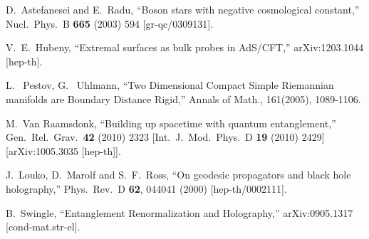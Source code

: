 \documentclass[12pt]{article}
\renewcommand{\(}{\left(}
\renewcommand{\)}{\right)}
\begin{document}
\begin{thebibliography}{999}
  D.~Astefanesei and E.~Radu,
  ``Boson stars with negative cosmological constant,''
  Nucl.\ Phys.\ B {\bf 665} (2003) 594
  [gr-qc/0309131].

  V.~E.~Hubeny,
  ``Extremal surfaces as bulk probes in AdS/CFT,''
  arXiv:1203.1044 [hep-th].

L. ~Pestov, G. ~Uhlmann,
``Two Dimensional Compact Simple Riemannian manifolds are Boundary Distance Rigid,''
Annals of Math., 161(2005), 1089-1106.

  M.~Van Raamsdonk,
  ``Building up spacetime with quantum entanglement,''
  Gen.\ Rel.\ Grav.\  {\bf 42} (2010) 2323
   [Int.\ J.\ Mod.\ Phys.\ D {\bf 19} (2010) 2429]
  [arXiv:1005.3035 [hep-th]].

  J.~Louko, D.~Marolf and S.~F.~Ross,
  ``On geodesic propagators and black hole holography,''
  Phys.\ Rev.\ D {\bf 62}, 044041 (2000)
  [hep-th/0002111].

  B.~Swingle,
  ``Entanglement Renormalization and Holography,''
  arXiv:0905.1317 [cond-mat.str-el].

\end{thebibliography}
\end{document}
